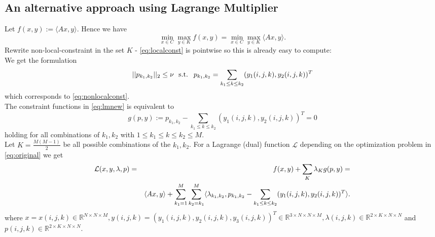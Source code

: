 \subsection{An alternative approach using Lagrange Multiplier}
            Let $f(x, y) := \langle Ax, y \rangle$. Hence we have
                \begin{equation}
                    \min_{x \in C} \max_{y \in K} f(x, y) = \min_{x \in C} \max_{y \in K} \langle Ax, y \rangle. \label{eq:original}
                \end{equation}
            Rewrite non-local-constraint in the set $K$ - \ref{eq:localconst} is pointwise so this is already easy to compute: \\
            We get the formulation
                \begin{equation}
                    ||p_{k_{1}, k_{2}}||_{2} \le \nu \,\,  \textnormal{ s.t. } \, \, p_{k_{1}, k_{2}} = \sum_{k_{1} \le k \le k_{2}} (y_{1}(i, j, k), y_{2}(i, j, k))^{T} \label{eq:lmnew}
                \end{equation}
            which corresponds to \ref{eq:nonlocalconst}. \\
            The constraint functions in \ref{eq:lmnew} is equivalent to
                \begin{equation}
                    g(p, y) := p_{k_{1}, k_{2}} - \sum_{k_{1} \le k \le k_{2}} (y_{1}(i, j, k), y_{2}(i, j, k))^{T} = 0 \label{eq:gofp}
                \end{equation}
            holding for all combinations of $k_{1}, k_{2}$ with $1 \le k_{1} \le k \le k_{2} \le M$. \\
            Let $K = \frac{M(M-1)}{2}$ be all possible combinations of the $k_{1}, k_{2}$. For a Lagrange (dual) function $\mathcal{L}$ depending on the optimization problem in \ref{eq:original} we get
                \begin{eqnarray}
                    \mathcal{L}(x, y, \lambda, p) &=& f(x, y) + \sum_{K} \lambda_{K} g(p, y) = \notag \\
                    &&\langle Ax, y \rangle + \sum_{k_{1} = 1}^{M} \sum_{k_{2} = k_{1}}^{M} \langle \lambda_{k_{1}, k_{2}}, p_{k_{1}, k_{2}} - \sum_{k_{1} \le k \le k_{2}} (y_{1}(i, j, k), y_{2}(i, j, k))^{T} \rangle.
                \end{eqnarray}
            where $x = x(i, j, k) \in \mathbb{R}^{N \times N \times M}, y(i, j, k) = (y_{1}(i, j, k), y_{2}(i, j, k), y_{3}(i, j, k))^{T} \in \mathbb{R}^{3 \times N \times N \times M}, \lambda(i, j, k) \in \mathbb{R}^{2 \times K \times N \times N}$ and $p(i, j, k) \in \mathbb{R}^{2 \times K \times N \times N}$. \\
